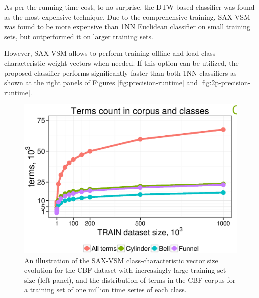 As per the running time cost, to no surprise, the DTW-based classifier was found as the most expensive technique. 
Due to the comprehensive training, SAX-VSM was found to be more expensive than 1NN Euclidean 
classifier on small training sets, but outperformed it on larger training sets.

However, SAX-VSM allows to perform training offline and load class-characteristic \tfidf weight vectors when needed. 
If this option can be utilized, the proposed classifier performs significantly faster than both 1NN classifiers as 
shown at the right panels of Figures \ref{fig:precision-runtime} and \ref{fig:2p-precision-runtime}.

\begin{figure}[t]
   \centering
   \includegraphics[width=140mm]{figures/words-cbf.ps}
   \caption{An illustration of the SAX-VSM class-characteristic vector size evolution for the CBF dataset 
   with increasingly large training set size (left panel), and the distribution of terms in the CBF corpus for 
   a training set of one million time series of each class.}
   \label{fig:venn-cbf}


\end{figure}
